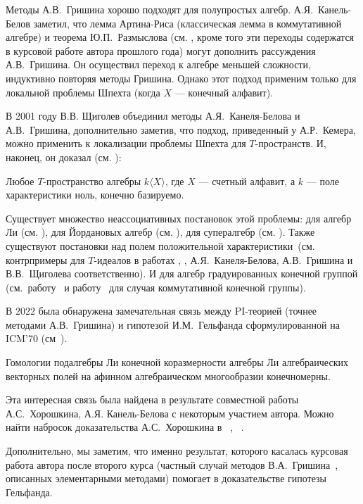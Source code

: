 Методы А.В.\ Гришина хорошо подходят для полупростых алгебр.
А.Я.\ Канель-Белов заметил, что лемма Артина-Риса (классическая лемма в коммутативной алгебре) и теорема Ю.П.\ Размыслова (см. \cite{GrishinSchigolev}, кроме того эти переходы содержатся в курсовой работе автора прошлого года) могут дополнить рассуждения А.В.\ Гришина.
Он осуществил переход к алгебре меньшей сложности, индуктивно повторяя методы Гришина.
Однако этот подход применим только для локальной проблемы Шпехта (когда $X$ — конечный алфавит).

В 2001 году В.В. Щиголев объединил методы А.Я.\ Канеля-Белова и А.В.\ Гришина, дополнительно заметив, что подход, приведенный у А.Р.\ Кемера, можно применить к локализации проблемы Шпехта для $T$-пространств.
И, наконец, он доказал (см. \cite{Shchigolev}):
\vskip 0.1in\noindent
\begin{theorem*} [В.В. Щиголев, 2001]
    Любое $T$-пространство алгебры $k\langle X\rangle$, где $X$ — счетный алфавит, а $k$ — поле характеристики ноль, конечно базируемо.
\end{theorem*}
\vskip 0.1in\noindent

Существует множество неассоциативных постановок этой проблемы: для алгебр Ли (см. \cite{Lie}), для Йордановых алгебр (см. \cite{Jordan}), для супералгебр (см. \cite{Super}).
Также существуют постановки над полем положительной характеристики\ (см. контрпримеры для $T$-идеалов в работах \cite{ConterKanel}, \cite{ConterGrishin}, \cite{ConterShchigolev} А.Я.\ Канеля-Белова, А.В.\ Гришина и В.В.\ Щиголева соответственно).
И для алгебр градуированных конечной группой (см.\ работу~\cite{GradedKanel} и работу~\cite{GradedSviridova} для случая коммутативной конечной группы).

В 2022 была обнаружена замечательная связь между PI-теорией (точнее методами А.В.\ Гришина) и гипотезой И.М.\ Гельфанда сформулированной на ICM’70 (см\ \cite{Gelfand}).
\vskip 0.1in\noindent
\begin{conjecture}[И.М.\ Гельфанд, 1970]
    \label{Gelfand}
    Гомологии подалгебры Ли конечной коразмерности алгебры Ли алгебраических векторных полей на афинном алгебраическом многообразии конечномерны.
\end{conjecture}
\vskip 0.1in\noindent
Эта интересная связь была найдена в результате совместной работы А.С.\ Хорошкина, А.Я. Канель-Белова с некоторым участием автора.
Можно найти набросок доказательства А.С.\ Хорошкина в ~\cite{Feigin-Kanel-Khoroshkin}, ~\cite{Centrone-Kanel-Khoroshkin-Vorobiov}.

Дополнительно, мы заметим, что именно результат, которого касалась курсовая работа автора после второго курса (частный случай методов В.А.\ Гришина~\cite{Grishin}, описанных элементарными методами) помогает в доказательстве гипотезы Гельфанда.